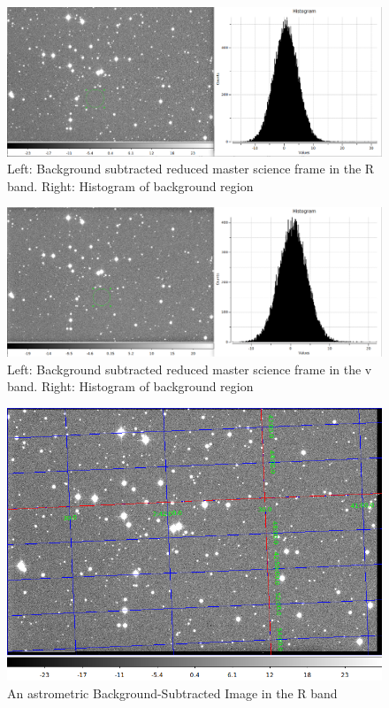 \documentclass[12pt]{article}
\begin{document}
    \begin{figure}[H]
    \centering
    \includegraphics[width=\textwidth]{fig/backsub_R.png}
    \caption{Left: Background subtracted reduced master science frame in the R band. Right: Histogram of background region}

    \end{figure}

    \begin{figure}[H]
    \centering
    \includegraphics[width=\textwidth]{fig/backsub_V.png}
    \caption{Left: Background subtracted reduced master science frame in the v band. Right: Histogram of background region}

    \end{figure}

    \begin{figure}[H]
    \centering
    \includegraphics[width=\textwidth]{fig/Astrometric_Calibration_R.png}
    \caption{An astrometric Background-Subtracted Image in the R band}

    \end{figure}
\end{document}
